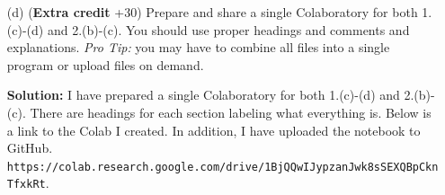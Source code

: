 \documentclass[a4paper]{article}
\begin{document}
\begin{enumerate}
\begin{itemize}
        \item[(d)] (\textbf{Extra credit} +30) Prepare and share a single Colaboratory for both 
        1.(c)-(d) and 2.(b)-(c).  You should use proper headings and comments and explanations.  
        \textit{Pro Tip:} you may have to combine all files into a single program or upload files 
        on demand.

        \textbf{Solution:} I have prepared a single Colaboratory for both 1.(c)-(d) and 2.(b)-(c).  
        There are headings for each section labeling what everything is.  Below is a link to the Colab 
        I created.  In addition, I have uploaded the notebook to GitHub.\\
        \verb|https://colab.research.google.com/drive/1BjQQwIJypzanJwk8sSEXQBpCknTfxkRt|.
    \end{itemize}
\end{enumerate}
\end{document}

